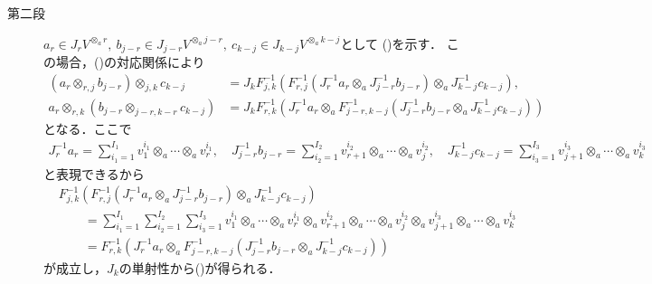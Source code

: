 \begin{prf}
\begin{description}
			\item[第二段]
				$a_r \in J_r V^{\otimes_a r},\ b_{j-r} \in J_{j-r} V^{\otimes_a j-r},
				\ c_{k-j} \in J_{k-j} V^{\otimes_a k-j}$として
				()を示す．
				この場合，()の対応関係により
				\begin{align}
					\left( a_r \otimes_{r,j} b_{j-r} \right) \otimes_{j,k} c_{k-j}
					&= J_k F_{j,k}^{-1}\left( F_{r,j}^{-1} \left( J_r^{-1}a_r \otimes_a J_{j-r}^{-1} b_{j-r} \right) \otimes_a J_{k-j}^{-1} c_{k-j} \right), \\
					a_r \otimes_{r,k} \left( b_{j-r} \otimes_{j-r,k-r} c_{k-j} \right)
					&= J_k F_{r,k}^{-1}\left( J_r^{-1}a_r \otimes_a F_{j-r,k-j}^{-1} \left( J_{j-r}^{-1} b_{j-r} \otimes_a J_{k-j}^{-1} c_{k-j} \right) \right)
				\end{align}
				となる．ここで
				\begin{align}
					J_r^{-1} a_r = \sum_{i_1 = 1}^{I_1} v_1^{i_1} \otimes_a \cdots \otimes_a v_r^{i_1},
					\quad J_{j-r}^{-1} b_{j-r} = \sum_{i_2 = 1}^{I_2} v_{r+1}^{i_2} \otimes_a \cdots \otimes_a v_j^{i_2},
					\quad J_{k-j}^{-1} c_{k-j} = \sum_{i_3 = 1}^{I_3} v_{j+1}^{i_3} \otimes_a \cdots \otimes_a v_k^{i_3}
				\end{align}
				と表現できるから
				\begin{align}
					&F_{j,k}^{-1}\left( F_{r,j}^{-1} \left( J_r^{-1}a_r \otimes_a J_{j-r}^{-1} b_{j-r} \right) \otimes_a J_{k-j}^{-1} c_{k-j} \right) \\
					&\qquad = \sum_{i_1=1}^{I_1}\sum_{i_2=1}^{I_2}\sum_{i_3=1}^{I_3} 
						v_1^{i_1} \otimes_a \cdots \otimes_a v_r^{i_1}
						\otimes_a v_{r+1}^{i_2} \otimes_a \cdots \otimes_a v_j^{i_2}
						\otimes_a v_{j+1}^{i_3} \otimes_a \cdots \otimes_a v_k^{i_3} \\
					&\qquad = 	F_{r,k}^{-1}\left( J_r^{-1}a_r \otimes_a F_{j-r,k-j}^{-1} \left( J_{j-r}^{-1} b_{j-r} \otimes_a J_{k-j}^{-1} c_{k-j} \right) \right)
				\end{align}
				が成立し，$J_k$の単射性から()が得られる．
			

\end{description}
\end{prf}
